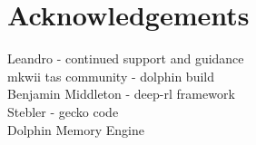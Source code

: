 
\chapter*{Acknowledgements}
Leandro - continued support and guidance
\\mkwii tas community - dolphin build
\\Benjamin Middleton - deep-rl framework
\\Stebler - gecko code
\\ Dolphin Memory Engine \cite{DolphinMemoryEngine}